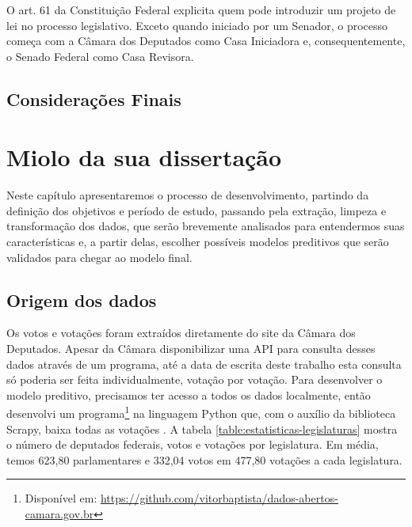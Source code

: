 \documentclass[a4paper,titlepage]{ppgi}\usepackage[]{graphicx}\usepackage[]{color}
\makeatletter
\newenvironment{kframe}{%
 \def\at@end@of@kframe{}%
 \ifinner\ifhmode%
  \def\at@end@of@kframe{\end{minipage}}%
  \begin{minipage}{\columnwidth}%
 \fi\fi%
 \def\FrameCommand##1{\hskip\@totalleftmargin \hskip-\fboxsep
 \colorbox{shadecolor}{##1}\hskip-\fboxsep
     \hskip-\linewidth \hskip-\@totalleftmargin \hskip\columnwidth}%
 \MakeFramed {\advance\hsize-\width
   \@totalleftmargin\z@ \linewidth\hsize
   \@setminipage}}%
 {\par\unskip\endMakeFramed%
 \at@end@of@kframe}
\newenvironment{knitrout}{}{} %
\makeatother
\begin{document}
O art. 61 da Constituição Federal explicita quem pode introduzir um projeto de
lei no processo legislativo. Exceto quando iniciado por um Senador, o processo
começa com a Câmara dos Deputados como Casa Iniciadora e, consequentemente, o
Senado Federal como Casa Revisora.

\section{Considerações Finais}


\begin{knitrout}
\color{fgcolor}\begin{kframe}


{\ttfamily\noindent\bfseries\color{errorcolor}{\#\# Error in `[<-.data.frame`(`*tmp*`, data[, column] == "{}"{}, column, value = NA): missing values are not allowed in subscripted assignments of data frames}}\end{kframe}
\end{knitrout}

\chapter{Miolo da sua dissertação}\label{cap:miolo}

Neste capítulo apresentaremos o processo de desenvolvimento, partindo da
definição dos objetivos e período de estudo, passando pela extração, limpeza e
transformação dos dados, que serão brevemente analisados para entendermos suas
características e, a partir delas, escolher possíveis modelos preditivos que
serão validados para chegar ao modelo final.

\section{Origem dos dados}




Os votos e votações foram extraídos diretamente do site da Câmara dos
Deputados. Apesar da Câmara disponibilizar uma \gls{API} para consulta desses
dados através de um programa, até a data de escrita deste trabalho esta
consulta só poderia ser feita individualmente, votação por votação. Para
desenvolver o modelo preditivo, precisamos ter acesso a todos os dados
localmente, então desenvolvi um programa\footnote{Disponível em:
\url{https://github.com/vitorbaptista/dados-abertos-camara.gov.br}} na
linguagem Python que, com o auxílio da biblioteca Scrapy, baixa todas as
votações \cite{Python276,Scrapy}. A tabela
\ref{table:estatisticas-legislaturas} mostra o número de deputados federais,
votos e votações por legislatura. Em média, temos 623,80
parlamentares e 332,04 votos em
477,80 votações a cada legislatura.
\nocite{CamaraDosDeputados2015}
\end{document}
